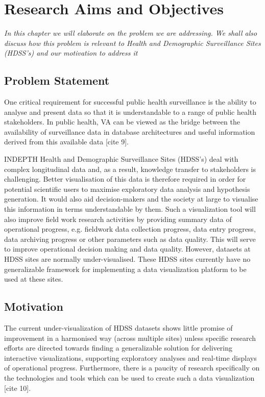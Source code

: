 \chapter{Research Aims and Objectives}\label{chap3}
\textit{In this chapter we will elaborate on the problem we are addressing. We shall also discuss how this problem is relevant to Health and Demographic Surveillance Sites (HDSS's) and our motivation to address it}
\vspace{2ex}\vfill
\minitoc
\newpage
 
\section{Problem Statement}\label{prob}
One critical requirement for successful public health surveillance is the ability to analyse and present data so that it is understandable to a range of public health stakeholders. In public health, VA can be viewed as the bridge between the availability of surveillance data in database architectures and useful information derived from this available data [cite 9].

INDEPTH Health and Demographic Surveillance Sites (HDSS's) deal with complex longitudinal data and, as a result, knowledge transfer to stakeholders is challenging. Better visualisation of this data is therefore required in order for potential scientific users to maximise exploratory data analysis and hypothesis generation. It would also aid decision-makers and the society at large to visualise this information in terms understandable by them. Such a visualization tool will also improve field work research activities by providing summary data of operational progress, e.g. fieldwork data collection progress, data entry progress, data archiving progress or other parameters such as data quality. This will serve to improve operational decision making and data quality. However, datasets at HDSS sites are normally under-visualised. These HDSS sites currently have no generalizable framework for implementing a data visualization platform to be used at these sites.

\section{Motivation}\label{motivation}

The current under-visualization of HDSS datasets shows little promise of improvement in a harmonised way (across multiple sites) unless specific research efforts are directed towards finding a generalizable solution for delivering interactive visualizations, supporting exploratory analyses and real-time displays of operational progress. Furthermore, there is a paucity of research specifically on the technologies and tools which can be used to create such a data visualization [cite 10].

